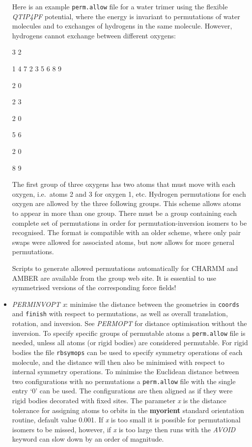 \documentclass[12pt,a4paper,dvips]{article}
\begin{document}
\begin{itemize}
Here is an example {\tt perm.allow} file for a water trimer using
the flexible {\it QTIP4PF\/} potential, where the energy is invariant to permutations
of water molecules and to exchanges of hydrogens in the same molecule. However,
hydrogens cannot exchange between different oxygens:
{

3 2

1 4 7 2 3 5 6 8 9

2 0 

2 3

2 0 

5 6

2 0 

8 9
}
The first group of three oxygens has two atoms that must move with each oxygen,
i.e.~atoms 2 and 3 for oxygen 1, etc. Hydrogen permutations for each oxygen are
allowed by the three following groups. This scheme allows atoms to appear in more 
than one group. There must be a group containing each complete set of permutations
in order for permutation-inversion isomers to be recognised. The format
is compatible with an older scheme, where only pair swaps were allowed for
associated atoms, but now allows for more general permutations.

Scripts to generate allowed permutations automatically for CHARMM and AMBER are available from
the group web site. It is essential to use symmetrised versions of the corresponding
force fields! 

\item {\it PERMINVOPT x\/}: minimise the distance between the geometries in
{\tt coords} and {\tt finish} with respect to permutations, as well
as overall translation, rotation, and inversion. See
{\it PERMOPT\/} for distance optimisation without the inversion.
To specify specific groups of
permutable atoms a {\tt perm.allow} file is needed, unless all atoms (or rigid bodies)
are considered permutable.
For rigid bodies the file {\tt rbsymops} can be used to specify symmetry
operations of each molecule, and the distance will then also be
minimised with respect to internal symmetry operations.
To minimise the Euclidean distance between two configurations with no permutations
a {\tt perm.allow} file with the single entry `0' can be used. 
The configurations are then aligned as if they were rigid bodies decorated
with fixed sites.
The parameter {\it x} is the distance tolerance for assigning atoms to orbits
in the {\bf myorient} standard orientation routine, default value 0.001.
If {\it x} is too small it is possible for permutational isomers to be missed,
however, if {\it x\/} is too large then runs with the {\it AVOID\/} keyword can
slow down by an order of magnitude.


\end{itemize}
\end{document}
